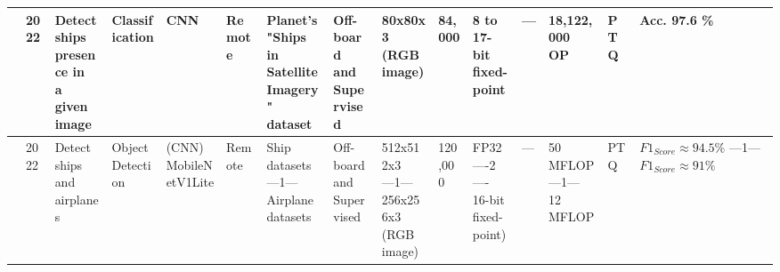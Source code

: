 \begin{center}
{\begin{tabular}{lllllllllllllll}
\cite{kyriakosResourcesPowerEfficient2022} & 2022 & \makecell[tl]{Detect ships\\ presence in\\ a given image} & Classification & CNN & Remote & \makecell[tl]{Planet's "Ships\\ in Satellite\\ Imagery" dataset} & \makecell[tl]{Off-board\\ and\\ Supervised} & \makecell[tl]{80x80x3\\ (RGB image)} & 84,000 & \makecell[tl]{8 to 17-bit\\ fixed-point} & --- & 18,122,000 OP & PTQ & Acc. 97.6 \% \\ \hline
\cite{nerisFPGABasedImplementationCNN2022} & 2022 & \makecell[tl]{Detect ships\\ and airplanes} & \makecell[tl]{Object\\ Detection} & \makecell[tl]{(CNN)\\ MobileNetV1Lite} & Remote & \makecell[tl]{Ship datasets\\ ---1---\\ Airplane datasets} & \makecell[tl]{Off-board\\ and\\ Supervised} & \makecell[tl]{512x512x3\\ ---1---\\ 256x256x3\\ (RGB image)} & 120,000 & \makecell[tl]{FP32\\ ----2----\\ 16-bit\\ fixed-point)} & --- & \makecell[tl]{50 MFLOP\\ ---1---\\ 12 MFLOP} & PTQ & \makecell[tl]{$F1_{Score}\approx 94.5\%$\\ ---1---\\ $F1_{Score}\approx 91\%$}  \\ \hline

\end{tabular}}
\end{center}
